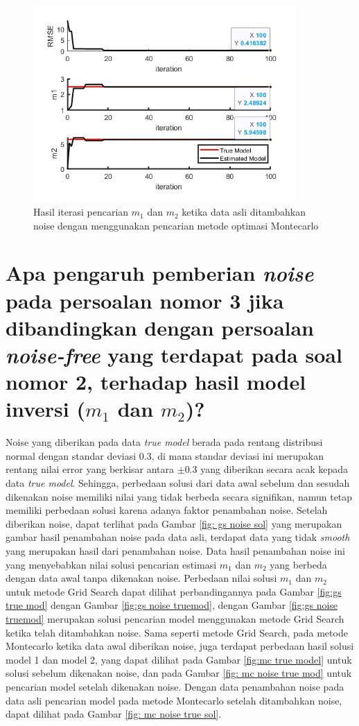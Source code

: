 \documentclass{article}
\begin{document}
\begin{figure}[h]
    \centering
    \includegraphics[width=10cm]{figure/mc noise rmse iterasi.jpg}
    \caption{Hasil iterasi pencarian $m_1$ dan $m_2$ ketika data asli ditambahkan noise dengan menggunakan pencarian metode optimasi Montecarlo}
    \label{fig: mc noise iterasi}
\end{figure}


\section{Apa pengaruh pemberian \textit{noise} pada persoalan nomor 3 jika dibandingkan dengan persoalan \textit{noise-free} yang terdapat pada soal nomor 2, terhadap hasil model inversi ($m_1$ dan $m_2$)?}

Noise yang diberikan pada data \textit{true model} berada pada rentang distribusi normal dengan standar deviasi $0.3$, di mana standar deviasi ini merupakan rentang nilai error yang berkisar antara $\pm 0.3$ yang diberikan secara acak kepada data \textit{true model}.
Sehingga, perbedaan solusi dari data awal sebelum dan sesudah dikenakan noise memiliki nilai yang tidak berbeda secara signifikan, namun tetap memiliki perbedaan solusi karena adanya faktor penambahan noise.
Setelah diberikan noise, dapat terlihat pada Gambar \ref{fig: gs noise sol} yang merupakan gambar hasil penambahan noise pada data asli, terdapat data yang tidak \textit{smooth} yang merupakan hasil dari penambahan noise. Data hasil penambahan noise ini yang menyebabkan nilai solusi pencarian estimasi $m_1$ dan $m_2$ yang berbeda dengan data awal tanpa dikenakan noise.
Perbedaan nilai solusi $m_1$ dan $m_2$ untuk metode Grid Search dapat dilihat perbandingannya pada Gambar \ref{fig:gs true mod} dengan Gambar \ref{fig:gs noise truemod}, dengan Gambar \ref{fig:gs noise truemod} merupakan solusi pencarian model menggunakan metode Grid Search ketika telah ditambahkan noise.
Sama seperti metode Grid Search, pada metode Montecarlo ketika data awal diberikan noise, juga terdapat perbedaan hasil solusi model 1 dan model 2, yang dapat dilihat pada Gambar \ref{fig:mc true model} untuk solusi sebelum dikenakan noise, dan pada Gambar \ref{fig: mc noise true mod} untuk pencarian model setelah dikenakan noise.
Dengan data penambahan noise pada data asli pencarian model pada metode Montecarlo setelah ditambahkan noise, dapat dilihat pada Gambar \ref{fig: mc noise true sol}.
\end{document}

